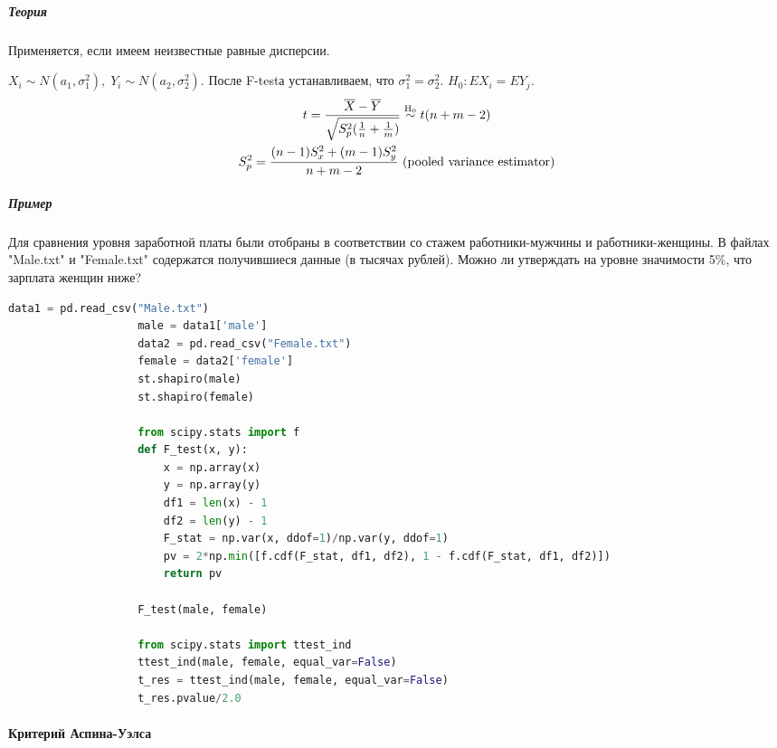 			\subparagraph*{Теория}\label{cha:2sample/sec:mo/subsec:pair/subsubsec:ftest/par:ttest/subpar:theory}

			Применяется, если имеем неизвестные равные дисперсии.

			$X_i \sim N(a_1, \sigma_1^2), \; Y_i \sim N(a_2, \sigma_2^2)$. После F-testа устанавливаем, что $\sigma_1^2 = \sigma_2^2$. $H_0: E X_i = E Y_j$.
			$$\begin{gathered}
				t = \frac{\overline{X} - \overline{Y}}{\sqrt{S_p^2 (\frac{1}{n} + \frac{1}{m})}} \mathrel{\stackrel{\rm H_0}\sim} t(n+m-2) \\
				S_p^2 = \frac{(n-1)S_x^2 + (m-1)S_y^2}{n+m-2} \text{ (pooled variance estimator)}
			\end{gathered}$$

			\subparagraph*{Пример}\label{cha:2sample/sec:mo/subsec:pair/subsubsec:ftest/par:ttest/subpar:prob}

			\begin{problem}
				Для сравнения уровня заработной платы были отобраны в соответствии со стажем работники-мужчины и работники-женщины. В файлах "Male.txt" и "Female.txt" содержатся получившиеся данные (в тысячах рублей). Можно ли утверждать на уровне значимости 5$\%$, что зарплата женщин ниже?
			\end{problem}
			\begin{solution}
				\begin{lstlisting}[language=Python]
					data1 = pd.read_csv("Male.txt")
					male = data1['male']
					data2 = pd.read_csv("Female.txt")
					female = data2['female']
					st.shapiro(male)
					st.shapiro(female)

					from scipy.stats import f
					def F_test(x, y):
					    x = np.array(x)
					    y = np.array(y)
					    df1 = len(x) - 1
					    df2 = len(y) - 1
					    F_stat = np.var(x, ddof=1)/np.var(y, ddof=1)
					    pv = 2*np.min([f.cdf(F_stat, df1, df2), 1 - f.cdf(F_stat, df1, df2)])
					    return pv
					
					F_test(male, female)

					from scipy.stats import ttest_ind
					ttest_ind(male, female, equal_var=False)
					t_res = ttest_ind(male, female, equal_var=False)
					t_res.pvalue/2.0
				\end{lstlisting}
			\end{solution}

		\paragraph{Критерий Аспина-Уэлса}\label{cha:2sample/sec:mo/subsec:pair/subsubsec:ftest/par:wales}

